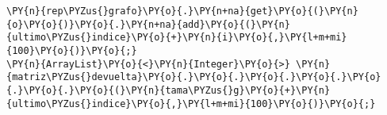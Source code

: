\begin{Verbatim}[commandchars=\\\{\}]
\PY{n}{rep\PYZus{}grafo}\PY{o}{.}\PY{n+na}{get}\PY{o}{(}\PY{n}{o}\PY{o}{)}\PY{o}{.}\PY{n+na}{add}\PY{o}{(}\PY{n}{ultimo\PYZus{}indice}\PY{o}{+}\PY{n}{i}\PY{o}{,}\PY{l+m+mi}{100}\PY{o}{)}\PY{o}{;}
\PY{n}{ArrayList}\PY{o}{<}\PY{n}{Integer}\PY{o}{>} \PY{n}{matriz\PYZus{}devuelta}\PY{o}{.}\PY{o}{.}\PY{o}{.}\PY{o}{.}\PY{o}{.}\PY{o}{.}\PY{o}{(}\PY{n}{tama\PYZus{}g}\PY{o}{+}\PY{n}{ultimo\PYZus{}indice}\PY{o}{,}\PY{l+m+mi}{100}\PY{o}{)}\PY{o}{;}
\end{Verbatim}
